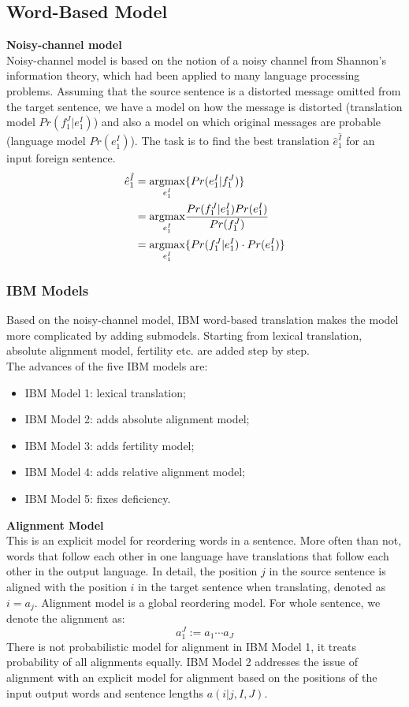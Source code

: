 \subsection{Word-Based Model}
\noindent \textbf{Noisy-channel model}\\
Noisy-channel model is
 based on the notion of a noisy channel from Shannon's information theory, which had been applied to many language processing problems. Assuming that the source sentence is a distorted message omitted from the target sentence, we have a model on  how the message is distorted (translation model $Pr(f_1^J|e_1^I)$) and also a model on which original messages are probable (language model ${Pr(e_1^I)}$). The task is to find the best translation $\hat{e}_1^{\hat{I}}$ for an input foreign sentence.
\begin{align*}
\hat{e}_1^{\hat{I}} & = \underset{e_1^I}{\operatorname{argmax}} \{Pr(e_1^I | f_1^J)\} \\ & = \underset{e_1^I}{\operatorname{argmax}} {\frac{Pr(f_1^J | e_1^I)Pr(e_1^I)}{Pr(f_1^J)}} \\
& = \underset{e_1^I}{\operatorname{argmax}} { \{ Pr(f_1^J | e_1^I) \cdot  Pr(e_1^I)\} }
\end{align*} 


\subsubsection{IBM Models}
Based on the noisy-channel model, IBM word-based translation makes the model more complicated by adding submodels. Starting from lexical translation, absolute alignment model, fertility etc. are added step by step.\\

The advances of the five IBM models are:
\begin{itemize}
	\item IBM Model 1: lexical translation;
	\item IBM Model 2: adds absolute alignment model;
	\item IBM Model 3: adds fertility model;
	\item IBM Model 4: adds relative alignment model;
	\item IBM Model 5: fixes deficiency.
\end{itemize}
 \textbf{Alignment Model} \\
 This is an explicit model for reordering words in a sentence. More often than not, words that follow each other in one language have translations  that follow each other in the output language. In detail, the position $j$ in the source sentence is aligned with the position $i$ in the target sentence when translating, denoted as  ${i=a_j}$. Alignment model is a global reordering model. For whole sentence, we denote the alignment as: 
\[a_1^J:= a_1\cdots a_J\]
There is not probabilistic model for alignment in IBM Model 1, it treats probability of all alignments equally. IBM Model 2 addresses the issue of alignment with an explicit model for alignment based on the positions of the input output words and sentence lengths $a(i|j, I, J)$. \\

